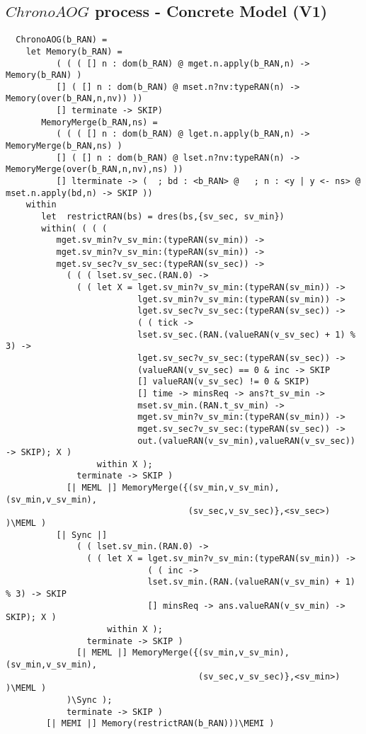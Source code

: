 \subsection{$ChronoAOG$ process - Concrete Model (V1)}

\begin{verbatim}
  ChronoAOG(b_RAN) =
    let Memory(b_RAN) =
          ( ( ( [] n : dom(b_RAN) @ mget.n.apply(b_RAN,n) -> Memory(b_RAN) )
          [] ( [] n : dom(b_RAN) @ mset.n?nv:typeRAN(n) -> Memory(over(b_RAN,n,nv)) ))
          [] terminate -> SKIP)
       MemoryMerge(b_RAN,ns) =
          ( ( ( [] n : dom(b_RAN) @ lget.n.apply(b_RAN,n) -> MemoryMerge(b_RAN,ns) )
          [] ( [] n : dom(b_RAN) @ lset.n?nv:typeRAN(n) -> MemoryMerge(over(b_RAN,n,nv),ns) ))
          [] lterminate -> (  ; bd : <b_RAN> @   ; n : <y | y <- ns> @  mset.n.apply(bd,n) -> SKIP ))
    within
       let  restrictRAN(bs) = dres(bs,{sv_sec, sv_min})
       within( ( ( (
          mget.sv_min?v_sv_min:(typeRAN(sv_min)) ->
          mget.sv_min?v_sv_min:(typeRAN(sv_min)) ->
          mget.sv_sec?v_sv_sec:(typeRAN(sv_sec)) ->
            ( ( ( lset.sv_sec.(RAN.0) ->
              ( ( let X = lget.sv_min?v_sv_min:(typeRAN(sv_min)) ->
                          lget.sv_min?v_sv_min:(typeRAN(sv_min)) ->
                          lget.sv_sec?v_sv_sec:(typeRAN(sv_sec)) ->
                          ( ( tick ->
                          lset.sv_sec.(RAN.(valueRAN(v_sv_sec) + 1) % 3) ->
                          lget.sv_sec?v_sv_sec:(typeRAN(sv_sec)) ->
                          (valueRAN(v_sv_sec) == 0 & inc -> SKIP
                          [] valueRAN(v_sv_sec) != 0 & SKIP)
                          [] time -> minsReq -> ans?t_sv_min ->
                          mset.sv_min.(RAN.t_sv_min) ->
                          mget.sv_min?v_sv_min:(typeRAN(sv_min)) ->
                          mget.sv_sec?v_sv_sec:(typeRAN(sv_sec)) ->
                          out.(valueRAN(v_sv_min),valueRAN(v_sv_sec)) -> SKIP); X )
                  within X );
              terminate -> SKIP )
            [| MEML |] MemoryMerge({(sv_min,v_sv_min),(sv_min,v_sv_min),
                                    (sv_sec,v_sv_sec)},<sv_sec>) )\MEML )
          [| Sync |]
              ( ( lset.sv_min.(RAN.0) ->
                ( ( let X = lget.sv_min?v_sv_min:(typeRAN(sv_min)) ->
                            ( ( inc ->
                            lset.sv_min.(RAN.(valueRAN(v_sv_min) + 1) % 3) -> SKIP
                            [] minsReq -> ans.valueRAN(v_sv_min) -> SKIP); X )
                    within X );
                terminate -> SKIP )
              [| MEML |] MemoryMerge({(sv_min,v_sv_min),(sv_min,v_sv_min),
                                      (sv_sec,v_sv_sec)},<sv_min>) )\MEML )
            )\Sync );
            terminate -> SKIP )
        [| MEMI |] Memory(restrictRAN(b_RAN)))\MEMI )
\end{verbatim}
\pagebreak

